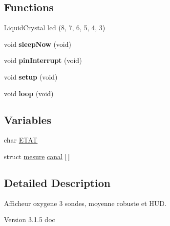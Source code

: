 \subsection*{Functions}
\begin{DoxyCompactItemize}
\item 
LiquidCrystal \hyperlink{version__3__1__5__docu_8ino_ae5fc907a4875b35b9992179c6ecf6dde}{lcd} (8, 7, 6, 5, 4, 3)
\item 
\hypertarget{version__3__1__5__docu_8ino_a8d79d10faa260aaab1ccb158fc9cbc4f}{
void {\bfseries sleepNow} (void)}
\label{version__3__1__5__docu_8ino_a8d79d10faa260aaab1ccb158fc9cbc4f}

\item 
\hypertarget{version__3__1__5__docu_8ino_ae2ed25aab748b2c21d4d6f3951e03e8f}{
void {\bfseries pinInterrupt} (void)}
\label{version__3__1__5__docu_8ino_ae2ed25aab748b2c21d4d6f3951e03e8f}

\item 
\hypertarget{version__3__1__5__docu_8ino_a7dfd9b79bc5a37d7df40207afbc5431f}{
void {\bfseries setup} (void)}
\label{version__3__1__5__docu_8ino_a7dfd9b79bc5a37d7df40207afbc5431f}

\item 
\hypertarget{version__3__1__5__docu_8ino_a0b33edabd7f1c4e4a0bf32c67269be2f}{
void {\bfseries loop} (void)}
\label{version__3__1__5__docu_8ino_a0b33edabd7f1c4e4a0bf32c67269be2f}

\end{DoxyCompactItemize}
\subsection*{Variables}
\begin{DoxyCompactItemize}
\item 
char \hyperlink{version__3__1__5__docu_8ino_adfa014924a11e5a329bd54ad88bf1ddc}{ETAT}
\item 
struct \hyperlink{structmesure}{mesure} \hyperlink{version__3__1__5__docu_8ino_aefff17cf4a5a87c3d04f604506918d3d}{canal} \mbox{[}$\,$\mbox{]}
\end{DoxyCompactItemize}


\subsection{Detailed Description}
Afficheur oxygene 3 sondes, moyenne robuste et HUD. \begin{DoxyVersion}{Version}
3.1.5 doc
\end{DoxyVersion}

